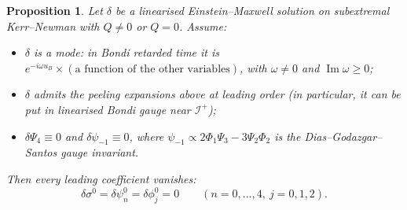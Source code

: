 \documentclass[11pt]{article}
\newtheorem{proposition}{Proposition}\theoremstyle{remark}\newtheorem{remark}{Remark}
\begin{document}
\begin{proposition}\label{prop:rad}
Let $\delta$ be a linearised Einstein--Maxwell solution on subextremal Kerr--Newman with $Q\neq0$ or $Q=0$. Assume:
\begin{itemize}
\item[(a)] $\delta$ is a mode: in Bondi retarded time it is $e^{-i\omega u_B}\times(\text{a function of the other variables})$, with $\omega\neq0$ and $\operatorname{Im}\omega\ge0$;
\item[(b)] $\delta$ admits the peeling expansions above at leading order (in particular, it can be put in linearised Bondi gauge near $\mathcal I^+$);
\item[(c)] $\delta\Psi_4\equiv0$ and $\delta\psi_{-1}\equiv0$, where $\psi_{-1}\propto 2\Phi_1\Psi_3-3\Psi_2\Phi_2$ is the Dias--Godazgar--Santos gauge invariant.
\end{itemize}
Then every leading coefficient vanishes:
\[
\delta\sigma^0=\delta\psi^0_n=\delta\phi^0_j=0\qquad (n=0,\dots,4,\ j=0,1,2).
\]
\end{proposition}
\end{document}
